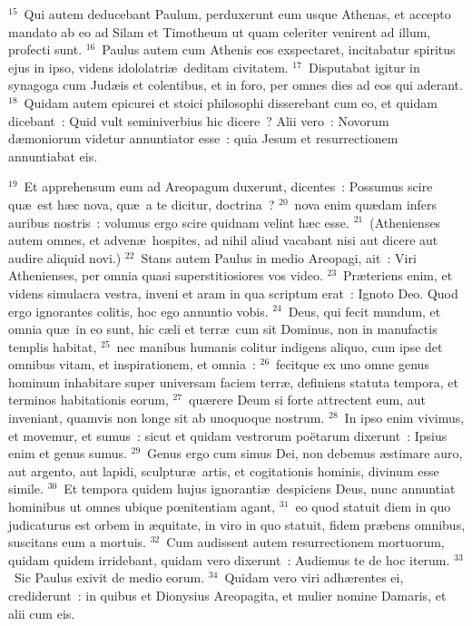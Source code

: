 ${}^{15}$~Qui autem deducebant Paulum, perduxerunt eum usque Athenas, et accepto mandato ab eo ad Silam et Timotheum ut quam celeriter venirent ad illum, profecti sunt.
${}^{16}$~Paulus autem cum Athenis eos exspectaret, incitabatur spiritus ejus in ipso, videns idololatri\ae\ deditam civitatem.
${}^{17}$~Disputabat igitur in synagoga cum Jud\ae is et colentibus, et in foro, per omnes dies ad eos qui aderant.
${}^{18}$~Quidam autem epicurei et stoici philosophi disserebant cum eo, et quidam dicebant~: Quid vult seminiverbius hic dicere~? Alii vero~: Novorum d\ae moniorum videtur annuntiator esse~: quia Jesum et resurrectionem annuntiabat eis.


${}^{19}$~Et apprehensum eum ad Areopagum duxerunt, dicentes~: Possumus scire qu\ae\ est h\ae c nova, qu\ae\ a te dicitur, doctrina~?
${}^{20}$~nova enim qu\ae dam infers auribus nostris~: volumus ergo scire quidnam velint h\ae c esse.
${}^{21}$~(Athenienses autem omnes, et adven\ae\ hospites, ad nihil aliud vacabant nisi aut dicere aut audire aliquid novi.)
${}^{22}$~Stans autem Paulus in medio Areopagi, ait~: Viri Athenienses, per omnia quasi superstitiosiores vos video.
${}^{23}$~Pr\ae teriens enim, et videns simulacra vestra, inveni et aram in qua scriptum erat~: Ignoto Deo. Quod ergo ignorantes colitis, hoc ego annuntio vobis.
${}^{24}$~Deus, qui fecit mundum, et omnia qu\ae\ in eo sunt, hic c\ae li et terr\ae\ cum sit Dominus, non in manufactis templis habitat,
${}^{25}$~nec manibus humanis colitur indigens aliquo, cum ipse det omnibus vitam, et inspirationem, et omnia~:
${}^{26}$~fecitque ex uno omne genus hominum inhabitare super universam faciem terr\ae , definiens statuta tempora, et terminos habitationis eorum,
${}^{27}$~qu\ae rere Deum si forte attrectent eum, aut inveniant, quamvis non longe sit ab unoquoque nostrum.
${}^{28}$~In ipso enim vivimus, et movemur, et sumus~: sicut et quidam vestrorum po\"etarum dixerunt~: Ipsius enim et genus sumus.
${}^{29}$~Genus ergo cum simus Dei, non debemus \ae stimare auro, aut argento, aut lapidi, sculptur\ae\ artis, et cogitationis hominis, divinum esse simile.
${}^{30}$~Et tempora quidem hujus ignoranti\ae\ despiciens Deus, nunc annuntiat hominibus ut omnes ubique pœnitentiam agant,
${}^{31}$~eo quod statuit diem in quo judicaturus est orbem in \ae quitate, in viro in quo statuit, fidem pr\ae bens omnibus, suscitans eum a mortuis.
${}^{32}$~Cum audissent autem resurrectionem mortuorum, quidam quidem irridebant, quidam vero dixerunt~: Audiemus te de hoc iterum.
${}^{33}$~Sic Paulus exivit de medio eorum.
${}^{34}$~Quidam vero viri adh\ae rentes ei, crediderunt~: in quibus et Dionysius Areopagita, et mulier nomine Damaris, et alii cum eis.
